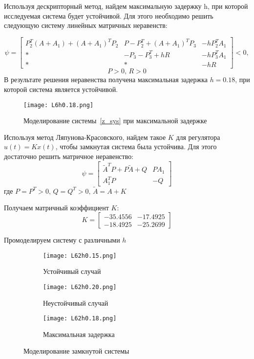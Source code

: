     Используя дескрипторный метод, найдем
    максимальную задержку h, при которой исследуемая система будет
    устойчивой. Для этого необходимо решить следующую систему
    линейных матричных неравенств:

    \begin{equation}
        \psi =
        \begin{bmatrix}
            P_2^T(A + A_1) + (A + A_1)^T P_2 & P - P_2^T + (A + A_1)^T P_3 & -hP_2^T A_1\\
            * & -P_3 - P_3^T + hR & -hP_3^T A_1\\
            * & * & -hR
        \end{bmatrix}
        < 0,
    \end{equation}
    \[P>0,\,R>0\]
    В результате решения неравенства получена максимальная задержка $h = 0.18$, при которой система является устойчивой.
    \begin{figure}[H]
        \centering
        \texttt{[image: L6h0.18.png]}
        \caption{Моделирование системы~\eqref{z_sys} при максимальной задержке}
    \end{figure}

    Используя метод Ляпунова-Красовского,
    найдем такое $K$ для регулятора $u(t) = Kx(t)$, чтобы замкнутая
    система была устойчива. Для этого достаточно решить матричное
    неравенство:
    \begin{equation}
        \psi =
        \begin{bmatrix}
            \tilde{A}^T P + P\tilde{A} + Q & PA_{1}\\
            A_{1}^TP & -Q
        \end{bmatrix}
    \end{equation} где $P = P^T>0,\,Q=Q^T>0,\,\tilde{A}=A+K$

    Получаем матричный коэффициент $K$:
    \begin{equation}
        K =
        \begin{bmatrix}
            -35.4556 & -17.4925\\
            -18.4925 & -25.2699
        \end{bmatrix}
    \end{equation}

    Промоделируем систему с различными $h$
    \begin{figure}[H]
        \centering
        \begin{subfigure}{0.49\linewidth}
            \texttt{[image: L62h0.15.png]}
            \caption{Устойчивый случай}
        \end{subfigure}
        \begin{subfigure}{0.49\linewidth}
            \texttt{[image: L62h0.20.png]}
            \caption{Неустойчивый случай}
        \end{subfigure}
        \begin{subfigure}{0.49\linewidth}
            \texttt{[image: L62h0.18.png]}
            \caption{Максимальная задержка}
        \end{subfigure}
        \caption{Моделирование замкнутой системы}
    \end{figure}
